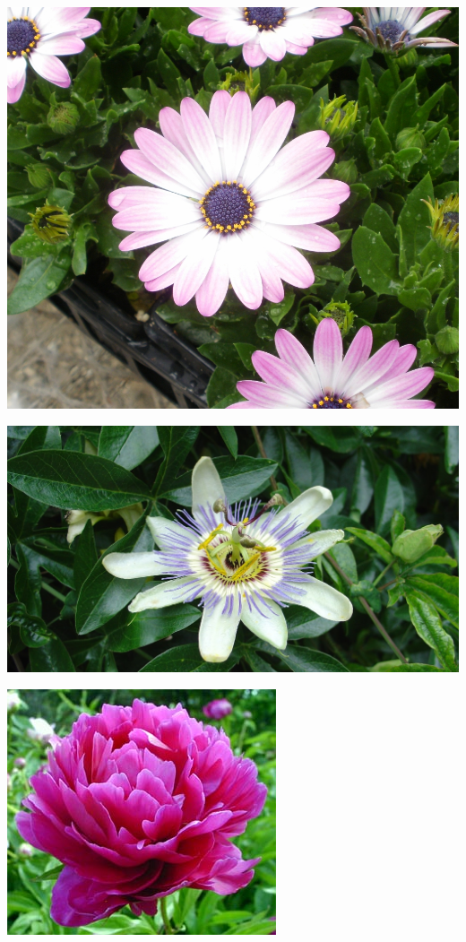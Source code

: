 \documentclass{article}
\begin{document}
\begin{center}
\includegraphics[width=0.9\textheight, angle=90]{../Ostespermum2.jpg}
\end{center}
\newpage

\begin{center}
\includegraphics[width=0.9\textheight, angle=90]{../Passiflora_(PassionFlower).jpg}
\end{center}
\newpage

\begin{center}
\includegraphics[width=0.9\textheight, angle=90]{../Peony_red.jpg}
\end{center}
\newpage
\end{document}
